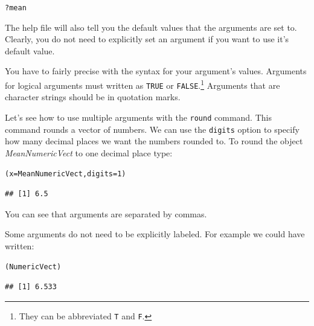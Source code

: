 \documentclass[krantz1]{krantz}
\begin{document}
\begin{knitrout}
\color{fgcolor}\begin{kframe}
\begin{alltt}
?mean
\end{alltt}
\end{kframe}
\end{knitrout}


\noindent The help file will also tell you the default values that the arguments are set to. Clearly, you do not need to explicitly set an argument if you want to use it's default value.

You have to fairly precise with the syntax for your argument's values. Arguments for logical arguments must written as \texttt{TRUE} or \texttt{FALSE}.\footnote{They can be abbreviated \texttt{T} and \texttt{F}.} Arguments that are character strings should be in quotation marks.

Let's see how to use multiple arguments with the \texttt{round} command. This command rounds a vector of numbers. We can use the \texttt{digits} option to specify how many decimal places we want the numbers rounded to. To round the object \emph{MeanNumericVect} to one decimal place type:

\begin{knitrout}
\color{fgcolor}\begin{kframe}
\begin{alltt}
(x = MeanNumericVect, digits = 1)
\end{alltt}
\begin{verbatim}
## [1] 6.5
\end{verbatim}
\end{kframe}
\end{knitrout}


\noindent You can see that arguments are separated by commas. 

Some arguments do not need to be explicitly labeled. For example we could have written:

\begin{knitrout}
\color{fgcolor}\begin{kframe}
\begin{alltt}
(NumericVect)
\end{alltt}
\begin{verbatim}
## [1] 6.533
\end{verbatim}
\end{kframe}
\end{knitrout}
\end{document}
